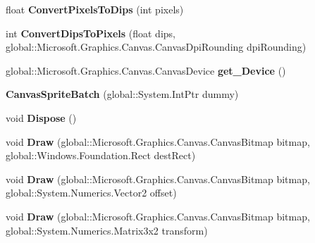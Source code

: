 \begin{DoxyCompactItemize}
float {\bfseries Convert\+Pixels\+To\+Dips} (int pixels)
\item 
\mbox{\label{class_microsoft_1_1_graphics_1_1_canvas_1_1_canvas_sprite_batch_ad29355a30ec2c41afbec5c8728561010}} 
int {\bfseries Convert\+Dips\+To\+Pixels} (float dips, global\+::\+Microsoft.\+Graphics.\+Canvas.\+Canvas\+Dpi\+Rounding dpi\+Rounding)
\item 
\mbox{\label{class_microsoft_1_1_graphics_1_1_canvas_1_1_canvas_sprite_batch_a6a382f246e096c28933db88bf3b579f7}} 
global\+::\+Microsoft.\+Graphics.\+Canvas.\+Canvas\+Device {\bfseries get\+\_\+\+Device} ()
\item 
\mbox{\label{class_microsoft_1_1_graphics_1_1_canvas_1_1_canvas_sprite_batch_a81340af827697e7a6d22bf42fc032c21}} 
{\bfseries Canvas\+Sprite\+Batch} (global\+::\+System.\+Int\+Ptr dummy)
\item 
\mbox{\label{class_microsoft_1_1_graphics_1_1_canvas_1_1_canvas_sprite_batch_af897e58d6cf8ed4ca4efaee7c5f9a12a}} 
void {\bfseries Dispose} ()
\item 
\mbox{\label{class_microsoft_1_1_graphics_1_1_canvas_1_1_canvas_sprite_batch_a5b0eff0bf7714bbaebd5c698e9a4926d}} 
void {\bfseries Draw} (global\+::\+Microsoft.\+Graphics.\+Canvas.\+Canvas\+Bitmap bitmap, global\+::\+Windows.\+Foundation.\+Rect dest\+Rect)
\item 
\mbox{\label{class_microsoft_1_1_graphics_1_1_canvas_1_1_canvas_sprite_batch_a8d4101527222c749dcfd590c5306aeb7}} 
void {\bfseries Draw} (global\+::\+Microsoft.\+Graphics.\+Canvas.\+Canvas\+Bitmap bitmap, global\+::\+System.\+Numerics.\+Vector2 offset)
\item 
\mbox{\label{class_microsoft_1_1_graphics_1_1_canvas_1_1_canvas_sprite_batch_a65cba582c2a39f5ba39b6b335f662889}} 
void {\bfseries Draw} (global\+::\+Microsoft.\+Graphics.\+Canvas.\+Canvas\+Bitmap bitmap, global\+::\+System.\+Numerics.\+Matrix3x2 transform)

\end{DoxyCompactItemize}
